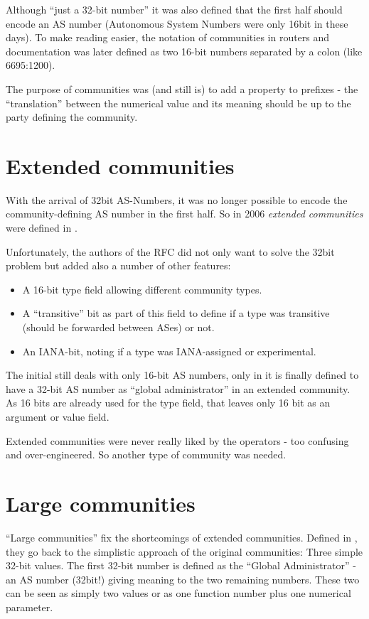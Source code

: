 Although ``just a 32-bit number'' it was also defined that the first half should encode an AS number (Autonomous System Numbers were only 16bit in these days). To make reading easier, the notation of communities in routers and documentation was later defined as two 16-bit numbers separated by a colon (like 6695:1200).

The purpose of communities was (and still is) to add a property to prefixes - the ``translation'' between the numerical value and its meaning should be up to the party defining the community.

\section{Extended communities}
With the arrival of 32bit AS-Numbers, it was no longer possible to encode the community-defining AS number in the first half. So in 2006 \emph{extended communities} were defined in \cite{rfc4360}.

Unfortunately, the authors of the RFC did not only want to solve the 32bit problem but added also a number of other features:
\begin{itemize}
  \item A 16-bit type field allowing different community types.
  \item A ``transitive'' bit as part of this field to define if a type was transitive (should be forwarded between ASes) or not.
  \item An IANA-bit, noting if a type was IANA-assigned or experimental.
\end{itemize}
The initial \cite{rfc4360} still deals with only 16-bit AS numbers, only in \cite{rfc5668} it is finally defined to have a 32-bit AS number as ``global administrator'' in an extended community. As 16 bits are already used for the type field, that leaves only 16 bit as an argument or value field.

Extended communities were never really liked by the operators - too confusing and over-engineered. So another type of community was needed.

\section{Large communities}
``Large communities'' fix the shortcomings of extended communities. Defined in \cite{rfc8092}, they go back to the simplistic approach of the original communities: Three simple 32-bit values. The first 32-bit number is defined as the ``Global Administrator'' - an AS number (32bit!) giving meaning to the two remaining numbers. These two can be seen as simply two values or as one function number plus one numerical parameter.

